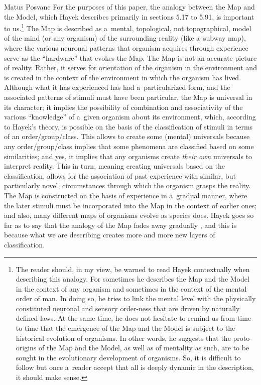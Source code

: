 \begin{artengenv}{Matus Posvanc}
For the purposes of this paper, the analogy between the Map and the Model, which Hayek 
\parencite*[][]{Hayek1952Sensory} %
 describes primarily in sections 5.17 to 5.91, is important to us.\footnote{The reader should, in my view, be warned to read Hayek contextually when describing this analogy. For sometimes he describes the Map and the Model in the context of any organism and sometimes in the context of the mental order of man. In doing so, he tries to link the mental level with the physically constituted neuronal and sensory order-ness that are driven by naturally defined laws. At the same time, he does not hesitate to remind us from time to time that the emergence of the Map and the Model is subject to the historical evolution of organisms. In other words, he suggests that the proto-origins of the Map and the Model, as well as of mentality as such, are to be sought in the evolutionary development of organisms. So, it is difficult to follow but once a~reader accept that all is deeply dynamic in the description, it should make sense.} The Map is described as a~mental, topological, not topographical, model of the mind (or any organism) of the surrounding reality (like a~subway map), where the various neuronal patterns that organism acquires through experience serve as the ``hardware'' that evokes the Map. The Map is not an accurate picture of reality. Rather, it serves for orientation of the organism in the environment and is created in the context of the environment in which the organism has lived. Although what it has experienced has had a~particularized form, and the associated patterns of stimuli must have been particular, the Map is universal in its character; it implies the possibility of combination and associativity of the various ``knowledge'' of a~given organism about its environment, which, according to Hayek's theory, is possible on the basis of the classification of stimuli in terms of an order/group/class. This allows to create some (mental) universals because any order/group/class implies that some phenomena are classified based on some similarities; and yes, it implies that any organisms create \textit{their own} universals to interpret reality. This in turn, meaning creating universals based on the classification, allows for the association of past experience with similar, but particularly novel, circumstances through which the organism grasps the reality. The Map is constructed on the basis of experience in a~gradual manner, where the later stimuli must be incorporated into the Map in the context of earlier ones; and also, many different maps of organisms evolve as species does. Hayek goes so far as to say that the analogy of the Map fades away gradually 
\parencite[][sec.5.30]{Hayek1952Sensory}, %
 and this is because what we are describing creates more and more new layers of classification.




\end{artengenv}
